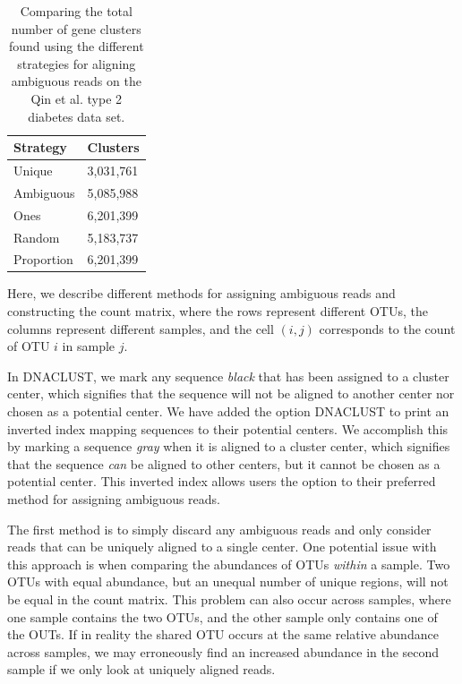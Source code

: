 \begin{table}[t]
\centering
\begin{tabular}{@{}ll@{}}
\toprule
Strategy   & Clusters  \\ \midrule
Unique     & 3,031,761 \\
Ambiguous  & 5,085,988 \\
Ones       & 6,201,399 \\
Random     & 5,183,737 \\
Proportion & 6,201,399 \\ \bottomrule
\end{tabular}
\caption{Comparing the total number of gene clusters found using the different strategies for aligning ambiguous reads on the Qin et al. type 2 diabetes data set.}
\label{table:ambiguous_reads}
\end{table}

Here, we describe different methods for assigning ambiguous reads and constructing the count matrix, where the rows represent different OTUs, the columns represent different samples, and the cell $(i,j)$ corresponds to the count of OTU $i$ in sample $j$.

In DNACLUST, we mark any sequence \emph{black} that has been assigned to a cluster center, which signifies that the sequence will not be aligned to another center nor chosen as a potential center.
We have added the option DNACLUST to print an inverted index mapping sequences to their potential centers.
We accomplish this by marking a sequence \emph{gray} when it is aligned to a cluster center, which signifies that the sequence \emph{can} be aligned to other centers, but it cannot be chosen as a potential center.
This inverted index allows users the option to their preferred method for assigning ambiguous reads.

The first method is to simply discard any ambiguous reads and only consider reads that can be uniquely aligned to a single center.
One potential issue with this approach is when comparing the abundances of OTUs \emph{within} a sample.
Two OTUs with equal abundance, but an unequal number of unique regions, will not be equal in the count matrix.
This problem can also occur across samples, where one sample contains the two OTUs, and the other sample only contains one of the OUTs.
If in reality the shared OTU occurs at the same relative abundance across samples, we may erroneously find an increased abundance in the second sample if we only look at uniquely aligned reads.


